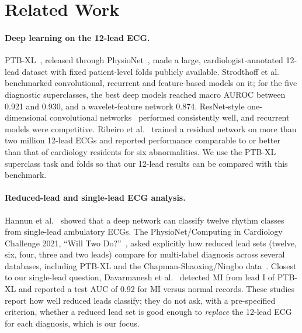 \section{Related Work}
\label{sec:related}

\paragraph{Deep learning on the 12-lead ECG.} PTB-XL~\cite{wagner2020ptbxl}, released through PhysioNet~\cite{goldberger2000physionet}, made a large, cardiologist-annotated 12-lead dataset with fixed patient-level folds publicly available. Strodthoff et al.~\cite{strodthoff2021benchmark} benchmarked convolutional, recurrent and feature-based models on it; for the five diagnostic superclasses, the best deep models reached macro AUROC between 0.921 and 0.930, and a wavelet-feature network 0.874. ResNet-style one-dimensional convolutional networks~\cite{he2016resnet} performed consistently well, and recurrent models were competitive. Ribeiro et al.~\cite{ribeiro2020automatic} trained a residual network on more than two million 12-lead ECGs and reported performance comparable to or better than that of cardiology residents for six abnormalities. We use the PTB-XL superclass task and folds so that our 12-lead results can be compared with this benchmark.

\paragraph{Reduced-lead and single-lead ECG analysis.} Hannun et al.~\cite{hannun2019cardiologist} showed that a deep network can classify twelve rhythm classes from single-lead ambulatory ECGs. The PhysioNet/Computing in Cardiology Challenge 2021, ``Will Two Do?''~\cite{reyna2021willtwodo}, asked explicitly how reduced lead sets (twelve, six, four, three and two leads) compare for multi-label diagnosis across several databases, including PTB-XL and the Chapman-Shaoxing/Ningbo data~\cite{zheng2020chapman}. Closest to our single-lead question, Davarmanesh et al.~\cite{davarmanesh2024leadI} detected MI from lead I of PTB-XL and reported a test AUC of 0.92 for MI versus normal records. These studies report how well reduced leads classify; they do not ask, with a pre-specified criterion, whether a reduced lead set is good enough to \emph{replace} the 12-lead ECG for each diagnosis, which is our focus.

